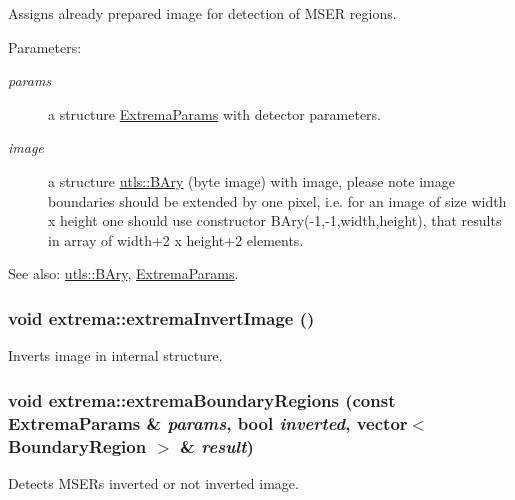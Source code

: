 Assigns already prepared image for detection of MSER regions. 

\begin{Desc}
\item[Parameters:]
\begin{description}
\item[{\em params}]a structure \hyperlink{structextrema_1_1ExtremaParams}{Extrema\-Params} with detector parameters. \item[{\em image}]a structure \hyperlink{namespaceutls_7b315fe6e5893d522a713ce2e66d6ae2}{utls::BAry} (byte image) with image, please note image boundaries should be extended by one pixel, i.e. for an image of size width x height one should use constructor BAry(-1,-1,width,height), that results in array of width+2 x height+2 elements.\end{description}
\end{Desc}
\begin{Desc}
\item[See also:]\hyperlink{namespaceutls_7b315fe6e5893d522a713ce2e66d6ae2}{utls::BAry}, \hyperlink{structextrema_1_1ExtremaParams}{Extrema\-Params}. \end{Desc}
\hypertarget{namespaceextrema_e4ac7c42ad05534147aba146344cf851}{
\subsubsection[extremaInvertImage]{\setlength{\rightskip}{0pt plus 5cm}void extrema::extrema\-Invert\-Image ()}}
\label{namespaceextrema_e4ac7c42ad05534147aba146344cf851}


Inverts image in internal structure. 

\hypertarget{namespaceextrema_2a64706a17a785da80d6a1df11aa8229}{
\subsubsection[extremaBoundaryRegions]{\setlength{\rightskip}{0pt plus 5cm}void extrema::extrema\-Boundary\-Regions (const Extrema\-Params \& {\em params}, bool {\em inverted}, vector$<$ Boundary\-Region $>$ \& {\em result})}}
\label{namespaceextrema_2a64706a17a785da80d6a1df11aa8229}


Detects MSERs inverted or not inverted image. 

